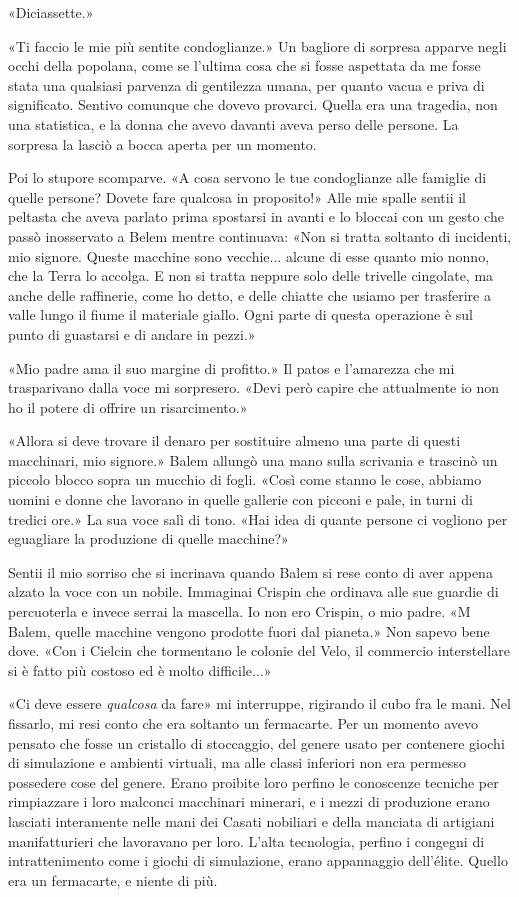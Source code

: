 «Diciassette.»

«Ti faccio le mie più sentite condoglianze.» Un bagliore di sorpresa
apparve negli occhi della popolana, come se l'ultima cosa che si fosse
aspettata da me fosse stata una qualsiasi parvenza di gentilezza umana,
per quanto vacua e priva di significato. Sentivo comunque che dovevo
provarci. Quella era una tragedia, non una statistica, e la donna che
avevo davanti aveva perso delle persone. La sorpresa la lasciò a bocca
aperta per un momento.

Poi lo stupore scomparve. «A cosa servono le tue condoglianze alle
famiglie di quelle persone? Dovete fare qualcosa in proposito!» Alle mie
spalle sentii il peltasta che aveva parlato prima spostarsi in avanti e
lo bloccai con un gesto che passò inosservato a Belem mentre continuava:
«Non si tratta soltanto di incidenti, mio signore. Queste macchine sono
vecchie... alcune di esse quanto mio nonno, che la Terra lo accolga. E
non si tratta neppure solo delle trivelle cingolate, ma anche delle
raffinerie, come ho detto, e delle chiatte che usiamo per trasferire a
valle lungo il fiume il materiale giallo. Ogni parte di questa
operazione è sul punto di guastarsi e di andare in pezzi.»

«Mio padre ama il suo margine di profitto.» Il patos e l'amarezza che mi
trasparivano dalla voce mi sorpresero. «Devi però capire che attualmente
io non ho il potere di offrire un risarcimento.»

«Allora si deve trovare il denaro per sostituire almeno una parte di
questi macchinari, mio signore.» Balem allungò una mano sulla scrivania
e trascinò un piccolo blocco sopra un mucchio di fogli. «Così come
stanno le cose, abbiamo uomini e donne che lavorano in quelle gallerie
con picconi e pale, in turni di tredici ore.» La sua voce salì di tono.
«Hai idea di quante persone ci vogliono per eguagliare la produzione di
quelle macchine?»

Sentii il mio sorriso che si incrinava quando Balem si rese conto di
aver appena alzato la voce con un nobile. Immaginai Crispin che ordinava
alle sue guardie di percuoterla e invece serrai la mascella. Io non ero
Crispin, o mio padre. «M Balem, quelle macchine vengono prodotte fuori
dal pianeta.» Non sapevo bene dove. «Con i Cielcin che tormentano le
colonie del Velo, il commercio interstellare si è fatto più costoso ed è
molto difficile...»

«Ci deve essere \emph{qualcosa} da fare» mi interruppe, rigirando il
cubo fra le mani. Nel fissarlo, mi resi conto che era soltanto un
fermacarte. Per un momento avevo pensato che fosse un cristallo di
stoccaggio, del genere usato per contenere giochi di simulazione e
ambienti virtuali, ma alle classi inferiori non era permesso possedere
cose del genere. Erano proibite loro perfino le conoscenze tecniche per
rimpiazzare i loro malconci macchinari minerari, e i mezzi di produzione
erano lasciati interamente nelle mani dei Casati nobiliari e della
manciata di artigiani manifatturieri che lavoravano per loro. L'alta
tecnologia, perfino i congegni di intrattenimento come i giochi di
simulazione, erano appannaggio dell'élite. Quello era un fermacarte, e
niente di più.

